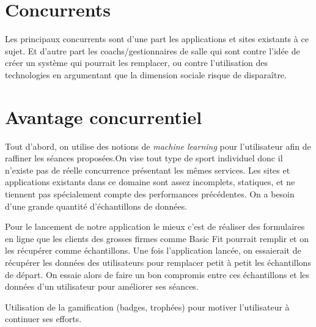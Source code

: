 \section{Concurrents}

Les principaux concurrents sont d'une part les applications et sites existants à ce sujet. Et d'autre part les coachs/gestionnaires de salle qui sont contre l'idée de créer un système qui pourrait les remplacer, ou contre l'utilisation des technologies en argumentant que la dimension sociale risque de disparaître. 

\section{Avantage concurrentiel}

Tout d'abord, on utilise des notions de \textit{machine learning} pour l'utilisateur afin de raffiner les séances proposées.On vise tout type de sport individuel donc il n'existe pas de réelle concurrence présentant les mêmes services. Les sites et applications existants dans ce domaine sont assez incomplets, statiques, et ne tiennent pas spécialement compte des performances précédentes. On a besoin d'une grande quantité d'échantillons de données. 

Pour le lancement de notre application le mieux c'est de réaliser des formulaires en ligne que les clients des grosses firmes comme Basic Fit pourrait remplir et on les récupérer comme échantillons. Une fois l'application lancée, on essaierait de récupérer les données des utilisateurs pour remplacer petit à petit les échantillons de départ. On essaie alors de faire un bon compromis entre ces échantillons et les données d'un utilisateur pour améliorer ses séances.

Utilisation de la gamification (badges, trophées) pour motiver l'utilisateur à continuer ses efforts.
